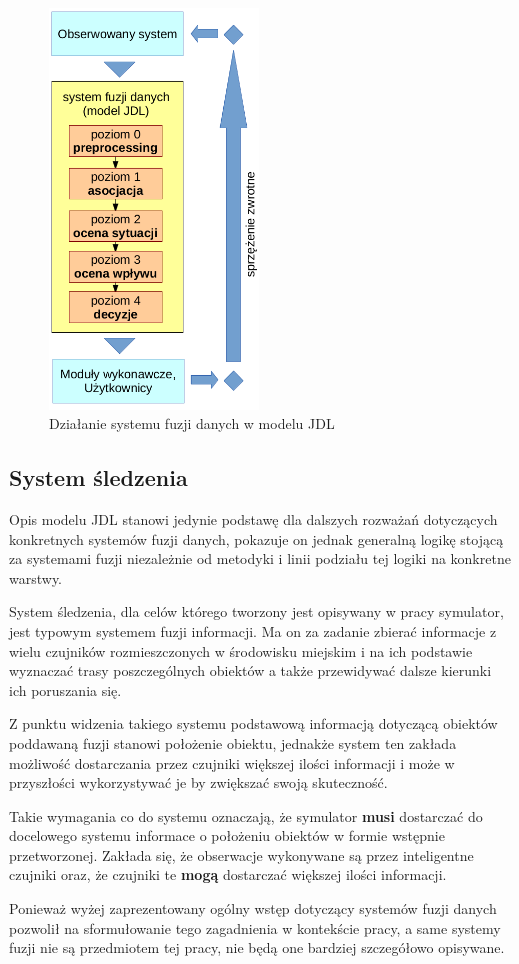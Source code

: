 \begin{figure}[htb]
    \begin{center}
	\includegraphics[width=15em,keepaspectratio]{img/jdl}
	\caption{Działanie systemu fuzji danych w modelu JDL}
	\label{jdl}
    \end{center}
\end{figure}

\subsection{System śledzenia}
\par{
Opis modelu JDL stanowi jedynie podstawę dla dalszych rozważań dotyczących konkretnych systemów fuzji danych, pokazuje on jednak generalną logikę stojącą za systemami fuzji niezależnie od metodyki i linii podziału tej logiki na konkretne warstwy.
}
\par{
System śledzenia, dla celów którego tworzony jest opisywany w pracy symulator, jest typowym systemem fuzji informacji. Ma on za zadanie zbierać informacje z wielu czujników rozmieszczonych w środowisku miejskim i na ich podstawie wyznaczać trasy poszczególnych obiektów a także przewidywać dalsze kierunki ich poruszania się.
}
\par{
Z punktu widzenia takiego systemu podstawową informacją dotyczącą obiektów poddawaną fuzji stanowi położenie obiektu, jednakże system ten zakłada możliwość dostarczania przez czujniki większej ilości informacji i może w przyszłości wykorzystywać je by zwiększać swoją skuteczność.
}
\par{
Takie wymagania co do systemu oznaczają, że symulator \textbf{musi} dostarczać do docelowego systemu informace o położeniu obiektów w formie wstępnie przetworzonej. Zakłada się, że obserwacje wykonywane są przez inteligentne czujniki oraz, że czujniki te \textbf{mogą} dostarczać większej ilości informacji.
}
\par{
Ponieważ wyżej zaprezentowany ogólny wstęp dotyczący systemów fuzji danych pozwolił na sformułowanie tego zagadnienia w kontekście pracy, a same systemy fuzji nie są przedmiotem tej pracy, nie będą one bardziej szczegółowo opisywane.
}

